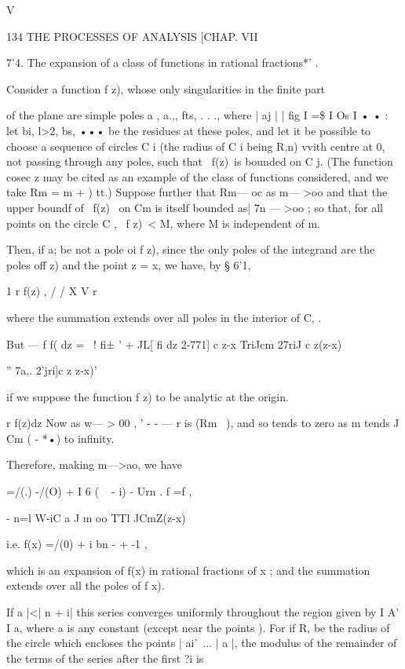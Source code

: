 V



134 THE PROCESSES OF ANALYSIS [CHAP. VII

  7'4. The expansion of a class of functions in rational fractions*' .

  Consider a function f z), whose only singularities in the finite
part

of the plane are simple poles a , a.,, fts, . . ., where | aj | | fig
I =\$ I Os I • • : let bi, l>2, bs, ••• be the residues at these
poles, and let it be possible to choose a sequence of circles C i (the
radius of C i being R,n) vvith centre at 0, not passing through any
poles, such that \ f(z)\ is bounded on C j. (The function cosec z may
be cited as an example of the class of functions considered, and we
take Rm = m + ) tt.) Suppose further that Rm— oc as m— >oo and that
the upper boundf of \ f(z) \ on Cm is itself bounded as| 7n — >oo ; so
that, for all points on the circle C , \ f z)\ < M, where M is
independent of m.

Then, if a; be not a pole oi f z), since the only poles of the
integrand are the poles off z) and the point z = x, we have, by § 6'1,

1 r f(z) , / / X V r

where the summation extends over all poles in the interior of C, .

But — f f( dz = ~! fi± ' + JL[ fi dz 2-771] c z-x TriJcm 27riJ c
z(z-x)

  '' 7a,. 2'jri]c z z-x)'

if we suppose the function f z) to be analytic at the origin.

r f(z)dz Now as w— > 00 , ' - - — r is (Rm~ ), and so tends to zero as
m tends J Cm ( - *•) to infinity.

Therefore, making m—>ao, we have

=/(.) -/(O) + I 6 ( ~ - i) - Urn . f =f ,

- n=l W-iC a J m oo TTl JCmZ(z-x)

i.e. f(x) =/(0) + i bn - + -1 ,

which is an expansion of f(x) in rational fractions of x ; and the
summation extends over all the poles of f x).

If a |<| n + i| this series converges uniformly throughout the region
given by I A' I a, where a is any constant (except near the points ).
For if R, be the radius of the circle which encloses the points |
ai'\, ... | a |, the modulus of the remainder of the terms of the
series after the first ?i is

